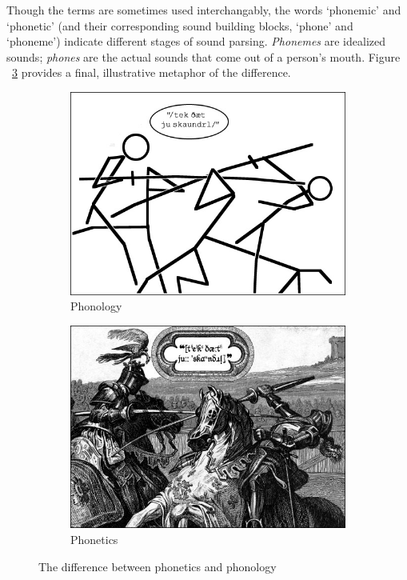 Though the terms are sometimes used interchangably, the words `phonemic' and `phonetic' (and their corresponding sound building blocks, `phone' and `phoneme')  indicate different stages of sound parsing.  \emph{Phonemes} are idealized sounds; \emph{phones} are the actual sounds that come out of a person's mouth.  Figure ~\ref{fig:knightsPhoneticPhonemic} provides a final, illustrative metaphor of the difference.
\begin{figure}[b]
\centering
        \begin{subfigure}[b]{0.4\textwidth}
                \centering
                \includegraphics[width=\textwidth]{knights_phonemic.jpg}
                \captionfonts
                \caption[Phonemic Knights]{Phonology\cite{cartoonPhonemic} }
                \label{fig:cartoonPhonemic}
        \end{subfigure}
        \quad
        \begin{subfigure}[b]{0.4\textwidth}
                \centering
                \includegraphics[width=\textwidth]{knights_phonetic.jpg}
                \captionfonts
                \caption[Phonetic Knights]{Phonetics\cite{cartoonPhonetic} }
                \label{fig:cartoonPhonetic}
        \end{subfigure}
\caption{The difference between phonetics and phonology}\label{fig:knightsPhoneticPhonemic}
\end{figure}
